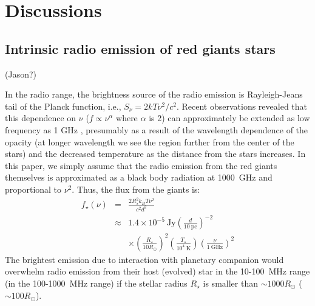 \documentclass{emulateapj}
\begin{document}
\newpage

\section{Discussions}
\label{s:discussion}

\subsection{Intrinsic radio emission of red giants stars}
\label{ss:RGradio}

(Jason?)

In the radio range, the brightness source of the radio emission is Rayleigh-Jeans tail of the Planck function, i.e., $S_{\nu } = 2kT\nu^2/c^2$. Recent observations revealed that this dependence on $\nu$ ($f \propto \nu^{\alpha }$ where $\alpha $ is 2) can approximately be extended as low frequency as 1 GHz \citep{gorman2013}, presumably as a result of the wavelength dependence of the opacity (at longer wavelength we see the region further from the center of the stars) and the decreased temperature as the distance from the stars increases. 
In this paper, we simply assume that the radio emission from the red giants themselves is approximated as a black body radiation at 1000~GHz and proportional to $\nu ^2$. 
Thus, the flux from the giants is:
\begin{eqnarray}
f_{\star } (\nu ) &=& \frac{2R_{\star }^2 k_B T \nu^2}{c^2 d^2}  \\
&\approx & 1.4 \times 10^{-5} ~\mbox{Jy} \left( \frac{d}{10 ~\mbox{pc}} \right)^{-2} \\
&& \times \left( \frac{R_{\star }}{10 R_{\odot }} \right)^2 \left( \frac{T_{\star }}{10^{4}~\mbox{K}} \right) \left( \frac{\nu}{1 ~\mbox{GHz}} \right)^2 
\end{eqnarray}
The brightest emission due to interaction with planetary companion would overwhelm radio emission from their host (evolved) star in the 10-100~MHz range (in the 100-1000~MHz range) if the stellar radius $R_{\star }$ is smaller than $\sim 1000R_{\odot }$ ($\sim 100R_{\odot }$). 


\end{document}
